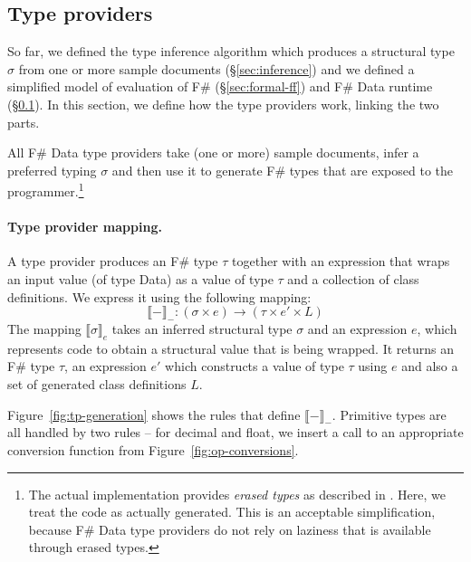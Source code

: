 \documentclass[10pt,preprint,blind,clearpagebib]{sigplanconf}
\newcommand{\ident}[1]{\textnormal{\sffamily #1}}
\newcommand{\sem}[1]{\llbracket #1 \rrbracket}
\begin{document}

\subsection{Type providers}
\label{sec:formal-tp}

So far, we defined the type inference algorithm which produces a structural type $\sigma$ from one 
or more sample documents (\S\ref{sec:inference}) and we defined a simplified model of evaluation
of F\# (\S\ref{sec:formal-ff}) and F\# Data runtime (\S\ref{sec:formal-tp}). In this section, we 
define how the type providers work, linking the two parts.

All F\# Data type providers take (one or more) sample documents, infer a preferred typing $\sigma$
and then use it to generate F\# types that are exposed to the programmer.\footnote{The actual 
implementation provides \emph{erased types} as described in \cite{fsharp-typeprov}. Here, we treat 
the code as actually generated. This is an acceptable simplification, because F\# Data type providers 
do not rely on laziness that is available through erased types.}

\paragraph{Type provider mapping.}
A type provider produces an F\# type $\tau$ together with an expression that wraps an input
value (of type \ident{Data}) as a value of type $\tau$ and a collection of class definitions. 
We express it using the following mapping:
%
\begin{equation*}
\sem{-}_{-} : (\sigma\times e) \rightarrow (\tau \times e' \times L)
\end{equation*}
%
The mapping $\sem{\sigma}_e$ takes an inferred structural type $\sigma$ and an expression $e$, 
which represents code to obtain a structural value that is being wrapped. It returns an F\# type 
$\tau$, an expression $e'$ which constructs a value of type $\tau$ using $e$ and also a set of 
generated class definitions $L$.

Figure~\ref{fig:tp-generation} shows the rules that define $\sem{-}_{-}$. Primitive types are all
handled by two rules -- for \ident{decimal} and \ident{float}, we insert a call to an appropriate 
conversion function from Figure~\ref{fig:op-conversions}.
\end{document}
